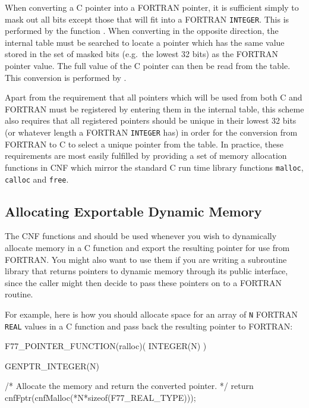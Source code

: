 \documentclass[twoside,11pt,nolof]{starlink}
\begin{document}
When converting a C pointer into a FORTRAN pointer, it is sufficient
simply to mask out all bits except those that will fit into a FORTRAN
\texttt{INTEGER}. This is performed by the function
.
When converting in the opposite direction, the
internal table must be searched to locate a pointer which has the same
value stored in the set of masked bits (e.g.\ the lowest 32 bits) as
the FORTRAN pointer value. The full value of the C pointer can then be
read from the table. This conversion is performed by
.

Apart from the requirement that all pointers which will be used from
both C and FORTRAN must be registered by entering them in the internal
table, this scheme also requires that all registered pointers should
be unique in their lowest 32 bits (or whatever length a FORTRAN
\texttt{INTEGER} has) in order for the conversion from FORTRAN to C to
select a unique pointer from the table. In practice, these
requirements are most easily fulfilled by providing a set of memory
allocation functions in CNF which mirror the standard C run time
library functions \texttt{malloc}, \texttt{calloc} and \texttt{free}.

\subsection{Allocating
Exportable Dynamic Memory}

The CNF functions
and
should be used whenever you wish to dynamically allocate memory in a C
function and export the resulting pointer for use from FORTRAN. You
might also want to use them if you are writing a subroutine library
that returns pointers to dynamic memory through its public interface,
since the caller might then decide to pass these pointers on to a
FORTRAN routine.

For example, here is how you should allocate space for an array of
\texttt{N} FORTRAN \texttt{REAL} values in a C function and pass back
the resulting pointer to FORTRAN:

\begin{small}
\begin{terminalv}
F77_POINTER_FUNCTION(ralloc)( INTEGER(N) )
{
   GENPTR_INTEGER(N)

/* Allocate the memory and return the converted pointer. */
   return cnfFptr(cnfMalloc(*N*sizeof(F77_REAL_TYPE)));
}
\end{terminalv}
\end{small}
\end{document}
